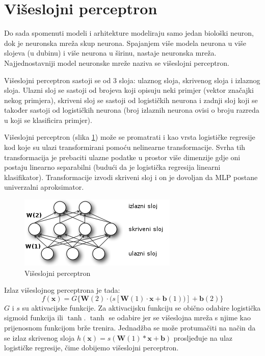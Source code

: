 \documentclass[times, utf8, diplomski, numeric]{fer}
\begin{document}
\section{Višeslojni perceptron}
\label{chap:viseslojni_perceptron}

Do sada spomenuti modeli i arhitekture modeliraju samo jedan biološki neuron, dok je neuronska mreža skup neurona. Spajanjem više modela neurona u više slojeva (u dubinu) i više neurona u širinu, nastaje neuronska mreža. Najjednostavniji model neuronske mreže naziva se višeslojni perceptron.

Višeslojni perceptron sastoji se od 3 sloja: ulaznog sloja, skrivenog sloja  i izlaznog sloja. Ulazni sloj se sastoji od brojeva koji opisuju neki primjer (vektor značajki nekog primjera), skriveni sloj se sastoji od logističkih neurona i zadnji sloj koji se također sastoji od logističkih neurona (broj izlaznih neurona ovisi o broju razreda u koji se klasificira primjer).

Višeslojni perceptron (slika \ref{fig:mlp}) može se promatrati i kao vrsta logističke regresije kod koje su ulazi transformirani pomoću nelinearne transformacije. Svrha tih transformacija je prebaciti ulazne podatke u prostor više dimenzije gdje oni postaju linearno separabilni (budući da je logistička regresija linearni klasifikator). Transformacije izvodi skriveni sloj i on je dovoljan da MLP postane univerzalni aproksimator. \cite{Hornik-1991}

\begin{figure}[htb]
\centering
\includegraphics{imgs/mlp.png}
\caption{Višeslojni perceptron}
\label{fig:mlp}
\end{figure}

Izlaz višeslojnog perceptrona je tada:
\begin{equation}
f(\boldsymbol{x}) = G\{\boldsymbol{W}(2) \cdot (s[\boldsymbol{W}(1) \cdot \boldsymbol{x} + \boldsymbol{b}(1))] + \boldsymbol{b}(2)\}
\label{eq:conv}
\end{equation}
$G$ i $s$ su aktivacijske funkcije. Za aktivacijsku funkciju se obično odabire logistička sigmoid funkcija ili $\tanh$. $\tanh$ se odabire jer se višeslojna mreža s njime kao prijenosnom funkcijom brže trenira.
Jednadžba se može protumačiti na način da se izlaz skrivenog sloja $h(\boldsymbol{x}) = s( \boldsymbol{W}(1) * \boldsymbol{x} + \boldsymbol{b} )$ prosljeđuje na ulaz logističke regresije, čime dobijemo višeslojni perceptron.
\end{document}
